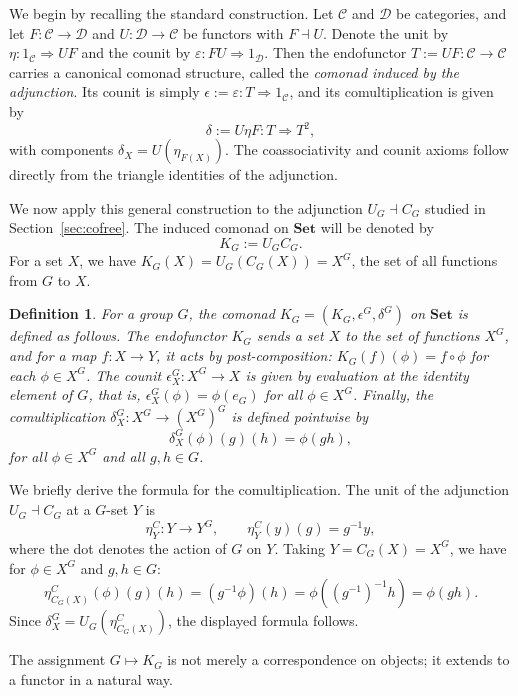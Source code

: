 \documentclass[10pt,a4paper]{amsart}
\newtheorem{definition}{Definition}
\begin{document}
 
We begin by recalling the standard construction. Let $\mathcal C$ and $\mathcal D$ be categories, and let $F \colon \mathcal C \rightarrow \mathcal D$ and $U \colon \mathcal D \rightarrow \mathcal C$ be functors with $F \dashv U$.  Denote the unit by $\eta \colon 1_{\mathcal C} \Rightarrow U F$ and the counit by $\varepsilon \colon F U \Rightarrow 1_{\mathcal D}$. Then the endofunctor $T := U F \colon \mathcal C \rightarrow \mathcal C$ carries a canonical comonad structure, called the \emph{comonad induced by the adjunction}. Its counit is simply $\epsilon := \varepsilon \colon T \Rightarrow 1_{\mathcal C}$, and its comultiplication is given by
\[
\delta := U \eta F \colon T \Rightarrow T^2,
\]
with components $\delta_X = U(\eta_{F(X)})$. The coassociativity and counit axioms follow directly from the triangle identities of the adjunction.


We now apply this general construction to the adjunction $U_G \dashv C_G$ studied in Section~\ref{sec:cofree}. The induced comonad on $\mathbf{Set}$ will be denoted by
\[
K_G := U_G C_G.
\]
For a set $X$, we have $K_G(X) = U_G(C_G(X)) = X^G$, the set of all functions from $G$ to $X$.

\begin{definition}
For a group $G$, the comonad $K_G = (K_G, \epsilon^G, \delta^G)$ on $\mathbf{Set}$ is defined as follows. The endofunctor $K_G$ sends a set $X$ to the set of functions $X^G$, and for a map $f: X \rightarrow Y$, it acts by post-composition: $K_G(f)(\phi) = f \circ \phi$ for each $\phi \in X^G$. The counit $\epsilon_X^G: X^G \rightarrow X$ is given by evaluation at the identity element of $G$, that is, $\epsilon_X^G(\phi) = \phi(e_G)$ for all $\phi \in X^G$. Finally, the comultiplication $\delta_X^G: X^G \rightarrow (X^G)^G$ is defined pointwise by
\[
\delta_X^G(\phi)(g)(h) = \phi(gh),
\]
for all $\phi \in X^G$ and all $g, h \in G$.
\end{definition}

We briefly derive the formula for the comultiplication. The unit of the adjunction $U_G \dashv C_G$ at a $G$-set $Y$ is
\[
\eta^C_Y \colon Y \rightarrow Y^G, \qquad \eta^C_Y(y)(g) = g^{-1}y,
\]
where the dot denotes the action of $G$ on $Y$. 
Taking $Y = C_G(X) = X^G$, we have for $\phi \in X^G$ and $g,h \in G$:
\[
\eta^C_{C_G(X)}(\phi)(g)(h) = (g^{-1}\phi)(h) = \phi((g^{-1})^{-1}h) = \phi(g h).
\]
Since $\delta^G_X = U_G(\eta^C_{C_G(X)})$, the displayed formula follows.
 
The assignment $G \mapsto K_G$ is not merely a correspondence on objects; it extends to a functor in a natural way.
\end{document}
